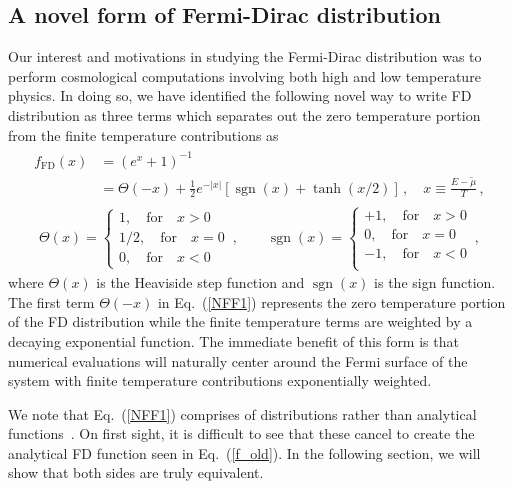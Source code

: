 \documentclass[sn-mathphys,Numbered]{sn-jnl}
\newcommand{\req}[1]{Eq.~(\ref{#1})}
\DeclareMathOperator{\sgn}{sgn}
\begin{document}
\subsection{A novel form of Fermi-Dirac distribution}
\label{Novel}
Our interest and motivations in studying the Fermi-Dirac distribution was to perform cosmological computations involving both high and low temperature physics. In doing so, we have identified the following novel way to write FD distribution as three terms which separates out the zero temperature portion from the finite temperature contributions as 
\begin{align}
\label{NFF1}
\begin{split}
f_\mathrm{FD}(x)
&=\left(e^{x}+1\right)^{-1}\\
&=\Theta(-x)+\frac{1}{2}e^{-|x|}\left[\sgn(x)+\tanh(x/2)\right]\,,\quad
x\equiv\frac{E-\widetilde\mu}{T}\,,
\end{split}
\end{align}
\begin{align}
\label{NFF2}
\Theta(x)=\left\{
\begin{array}{r}
1,\quad\mathrm{for}\quad{x}>0\\
1/2,\quad\mathrm{for}\quad{x}=0\\
0,\quad\mathrm{for}\quad{x}<0
\end{array}\right.\,,\qquad
\sgn(x)=\left\{
\begin{array}{r}
+1,\quad\mathrm{for}\quad{x}>0\\
0,\quad\mathrm{for}\quad{x}=0\\
-1,\quad\mathrm{for}\quad{x}<0\\
\end{array}\right.\,,
\end{align}
where $\Theta(x)$ is the Heaviside step function and $\sgn(x)$ is the sign function. The first term $\Theta(-x)$ in \req{NFF1} represents the zero temperature portion of the FD distribution while the finite temperature terms are weighted by a decaying exponential function. The immediate benefit of this form is that numerical evaluations will naturally center around the Fermi surface of the system with finite temperature contributions exponentially weighted.

We note that \req{NFF1} comprises of distributions rather than analytical functions~\cite{Arfken:2011abc}. On first sight, it is difficult to see that these cancel to create the analytical FD function seen in \req{f_old}. In the following section, we will show that both sides are truly equivalent.
\end{document}
